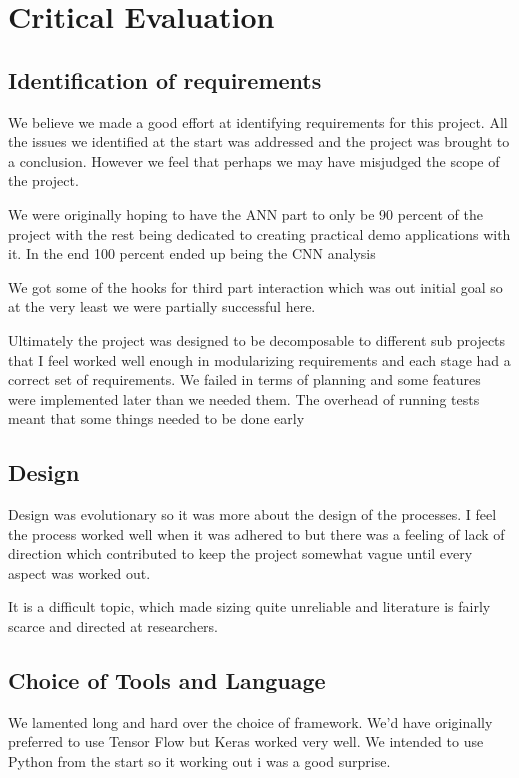 \chapter{Critical Evaluation}

\section{Identification of requirements}
We believe we made a good effort at identifying requirements for this project. All the issues we identified at the start was addressed and the project was brought to a conclusion. However we feel that perhaps we may have misjudged the scope of the project.

We were originally hoping to have the ANN part to only be 90 percent of the project with the rest being dedicated to creating practical demo applications with it. In the end 100 percent ended up being the CNN analysis

We got some of the hooks for third part interaction which was out initial goal so at the very least we were partially successful here.

Ultimately the project was designed to be decomposable to different sub projects that I feel worked well enough in modularizing requirements and each stage had a correct set of requirements. We failed in terms of planning and some features were implemented later than we needed them. The overhead of running tests meant that some things needed to be done early

\section{Design}
Design was evolutionary so it was more about the design of the processes. I feel the process worked well when it was adhered to but there was a feeling of lack of direction which contributed to keep the project somewhat vague until every aspect was worked out.

It is a difficult topic, which made sizing quite unreliable and literature is fairly scarce and directed at researchers.

\section{Choice of Tools and Language}
We lamented long and hard over the choice of framework. We'd have originally preferred to use Tensor Flow but Keras worked very well. We intended to use Python from the start so it working out i was a good surprise.

